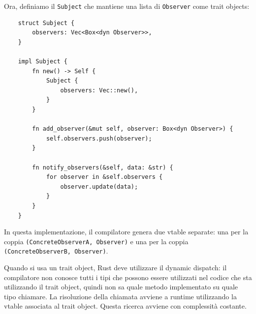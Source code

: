 Ora, definiamo il \texttt{Subject} che mantiene una lista di \texttt{Observer} come trait objects:
\begin{verbatim}
    struct Subject {
        observers: Vec<Box<dyn Observer>>,
    }

    impl Subject {
        fn new() -> Self {
            Subject {
                observers: Vec::new(),
            }
        }

        fn add_observer(&mut self, observer: Box<dyn Observer>) {
            self.observers.push(observer);
        }

        fn notify_observers(&self, data: &str) {
            for observer in &self.observers {
                observer.update(data);
            }
        }
    }
\end{verbatim}
In questa implementazione, il compilatore genera due vtable separate: una per la coppia \texttt{(ConcreteObserverA, Observer)} e una per la coppia \texttt{(ConcreteObserverB, Observer)}. 

Quando si usa un trait object, Rust deve utilizzare il dynamic dispatch: il compilatore non conosce tutti i tipi che possono essere utilizzati nel codice che sta utilizzando il trait object, quindi non sa quale metodo implementato su quale tipo chiamare. La risoluzione della chiamata avviene a runtime utilizzando la vtable associata al trait object. Questa ricerca avviene con complessità costante. 
